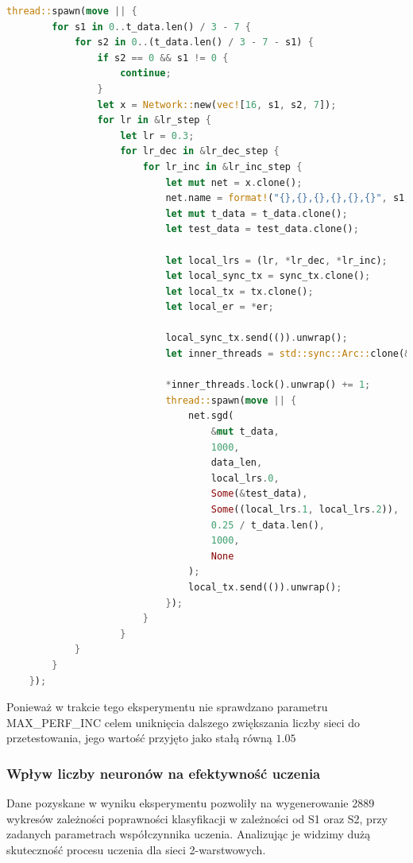 \documentclass[12pt,twoside]{article}
\begin{document}
\begin{lstlisting}[language=Rust,caption=Modyfikacja kodu tworzącego instancje sieci na potrzeby eksperymentu,label={lst:test1}]
    thread::spawn(move || {
        for s1 in 0..t_data.len() / 3 - 7 {
            for s2 in 0..(t_data.len() / 3 - 7 - s1) {
                if s2 == 0 && s1 != 0 {
                    continue;
                }
                let x = Network::new(vec![16, s1, s2, 7]);
                for lr in &lr_step {
                    let lr = 0.3;
                    for lr_dec in &lr_dec_step {
                        for lr_inc in &lr_inc_step {
                            let mut net = x.clone();
                            net.name = format!("{},{},{},{},{},{}", s1, s2, lr, lr_dec, lr_inc, er);
                            let mut t_data = t_data.clone();
                            let test_data = test_data.clone();

                            let local_lrs = (lr, *lr_dec, *lr_inc);
                            let local_sync_tx = sync_tx.clone();
                            let local_tx = tx.clone();
                            let local_er = *er;

                            local_sync_tx.send(()).unwrap();
                            let inner_threads = std::sync::Arc::clone(&tmp_threads);

                            *inner_threads.lock().unwrap() += 1;
                            thread::spawn(move || {
                                net.sgd(
                                    &mut t_data,
                                    1000,
                                    data_len,
                                    local_lrs.0,
                                    Some(&test_data),
                                    Some((local_lrs.1, local_lrs.2)),
                                    0.25 / t_data.len(),
                                    1000,
                                    None
                                );
                                local_tx.send(()).unwrap();
                            });
                        }
                    }
            }
        }
    });
\end{lstlisting}

Ponieważ w trakcie tego eksperymentu nie sprawdzano parametru MAX\_PERF\_INC celem uniknięcia dalszego zwiększania liczby sieci do przetestowania, jego wartość przyjęto jako stałą równą $1.05$

\subsubsection{Wpływ liczby neuronów na efektywność uczenia}
Dane pozyskane w wyniku eksperymentu pozwoliły na wygenerowanie 2889 wykresów zależności poprawności klasyfikacji w zależności od S1 oraz S2, przy zadanych parametrach współczynnika uczenia.
Analizując je widzimy dużą skuteczność procesu uczenia dla sieci 2-warstwowych.
\end{document}

